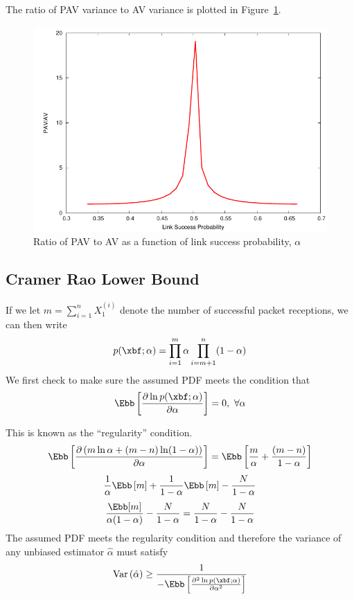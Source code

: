 \documentclass[10pt]{article}
\DeclareMathOperator{\var}{Var}
\begin{document}
The ratio of \ac{PAV} variance to \ac{AV} variance is plotted in Figure~\ref{fig:ratio}.

\begin{figure}
\centering
\includegraphics[width=0.5\columnwidth]{img/ratio}
\caption[Ratio of \acs{PAV} to \acs{AV} as a function of link success probability, $\alpha$]{Ratio of \acf{PAV} to \acf{AV} as a function of link success probability, $\alpha$}\label{fig:ratio}
\end{figure}

\subsection{Cramer Rao Lower Bound}
If we let $m = \displaystyle\sum_{i=1}^nX_1^{(i)}$ denote the number of successful packet receptions, we can then write
\begin{equation}
p(\xbf;\alpha)=\displaystyle\prod_{i=1}^{m}\alpha\prod_{i=m+1}^{n}(1-\alpha)\label{eq:pdf}
\end{equation}
We first check to make sure the assumed \ac{PDF} meets the condition that
\begin{equation}
\Ebb\left[\frac{\partial \ln p(\xbf;\alpha)}{\partial\alpha}\right]=0,~\forall \alpha
\end{equation}

This is known as the ``regularity'' condition.
\[
\Ebb\left[\frac{\partial \left(m\ln\alpha + (m-n)\ln(1-\alpha)\right)}{\partial\alpha}\right]=\Ebb\left[\frac{m}{\alpha}+\frac{(m-n)}{1-\alpha}\right]
\]
\[
\frac{1}{\alpha}\Ebb\left[m\right]+\frac{1}{1-\alpha}\Ebb\left[m\right]-\frac{N}{1-\alpha}
\]
\[
\frac{\Ebb[m]}{\alpha(1-\alpha)}-\frac{N}{1-\alpha}=\frac{N}{1-\alpha}-\frac{N}{1-\alpha}
\]
The assumed \ac{PDF} meets the regularity condition and therefore the variance of any unbiased estimator $\hat{\alpha}$ must satisfy
\begin{equation}
\var\left(\hat{\alpha}\right) \geq \frac{1}{-\Ebb\left[\frac{\partial^2\ln p(\xbf;\alpha)}{\partial\alpha^2}\right]}
\end{equation}
\end{document}
